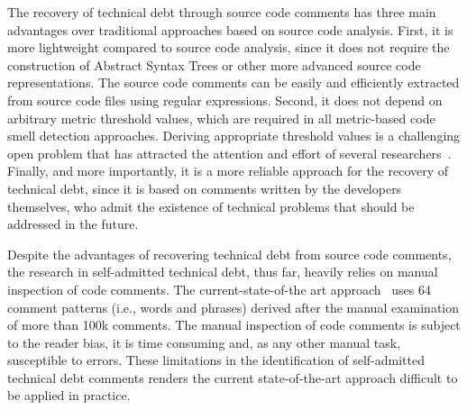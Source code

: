 \documentclass[10pt,journal,compsoc]{IEEEtran}
\newcommand{\emad}[1]{\textcolor{red}{{\it [Emad: #1]}}}
\newcommand{\SATD}{self-admitted technical debt\xspace}
\begin{document}
The recovery of technical debt through source code comments has three main advantages over traditional approaches based on source code analysis. First, it is more lightweight compared to source code analysis, since it does not require the construction of Abstract Syntax Trees or other more advanced source code representations. The source code comments can be easily and efficiently extracted from source code files using regular expressions.
Second, it does not depend on arbitrary metric threshold values, which are required in all metric-based code smell detection approaches.
Deriving appropriate threshold values is a challenging open problem that has attracted the attention and effort of several researchers~\cite{Oliveira:2014,Fontana:2015,Fontana:EMSE:2015}.
Finally, and more importantly, it is a more reliable approach for the recovery of technical debt, since it is based on comments written by the developers themselves, who admit the existence of technical problems that should be addressed in the future.

Despite the advantages of recovering technical debt from source code comments, the research in \SATD, thus far, heavily relies on manual inspection of code comments. The current-state-of-the art approach~\cite{Potdar2014ICSME} uses 64 comment patterns (i.e., words and phrases) derived after the manual examination of more than 100k comments. The manual inspection of code comments is subject to the reader bias, it is time consuming and, as any other manual task, susceptible to errors. These limitations in the identification of \SATD comments renders the current state-of-the-art approach difficult to be applied in practice.
\end{document}
